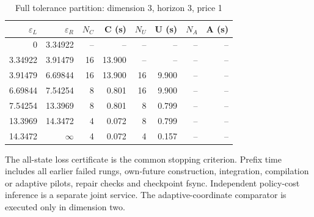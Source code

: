\begin{table}[htbp]
\centering
\caption{Full tolerance partition: dimension 3, horizon 3, price 1}\label{tab:frontier-full48-3-3-1}
\footnotesize
\begin{tabular}{rrrrrrrr}
\toprule
$\varepsilon_L$ & $\varepsilon_R$ & $N_C$ & C (s) & $N_U$ & U (s) & $N_A$ & A (s)\\
\midrule
0 & 3.34922 & -- & -- & -- & -- & -- & -- \\
3.34922 & 3.91479 & 16 & 13.900 & -- & -- & -- & -- \\
3.91479 & 6.69844 & 16 & 13.900 & 16 & 9.900 & -- & -- \\
6.69844 & 7.54254 & 8 & 0.801 & 16 & 9.900 & -- & -- \\
7.54254 & 13.3969 & 8 & 0.801 & 8 & 0.799 & -- & -- \\
13.3969 & 14.3472 & 4 & 0.072 & 8 & 0.799 & -- & -- \\
14.3472 & $\infty$ & 4 & 0.072 & 4 & 0.157 & -- & -- \\
\bottomrule
\end{tabular}
\begin{minipage}{0.97\linewidth}\footnotesize\vspace{3pt}
The all-state loss certificate is the common stopping criterion. Prefix time includes all earlier failed rungs, own-future construction, integration, compilation or adaptive pilots, repair checks and checkpoint fsync. Independent policy-cost inference is a separate joint service. The adaptive-coordinate comparator is executed only in dimension two.
\end{minipage}
\end{table}

